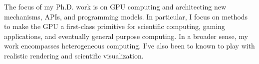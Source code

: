 The focus of my Ph.D. work is on GPU computing and architecting new mechanisms, APIs, and programming models. In  particular, I focus on methods to make the GPU a first-class primitive for scientific computing, gaming applications, and eventually general purpose computing. In a broader sense, my work encompasses heterogeneous computing. I've also been to known to play with realistic rendering and scientific visualization.

